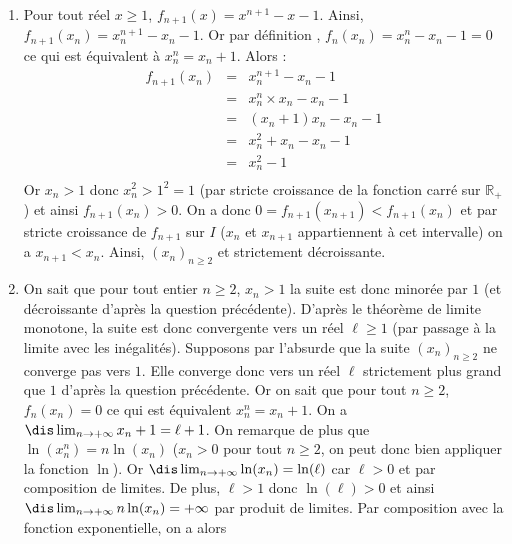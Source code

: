 \documentclass[a4paper,10pt]{report}
\begin{document}
\begin{enumerate}
\begin{center}
\end{center}
La fonction $f_n$ est continue et strictement croissante sur $I$, on a : 
$$\dis \lim_{x \rightarrow 1} f_n(x)=-1, \; \lim_{ x \rightarrow + \infty} f_n(x)= + \infty$$
 et $0 \in ]-1, + \infty [$. D'après le théorème de bijection, il existe un unique réel $x_n \in ]1, + \infty[$ tel que $f_n(x_n)=0.$
\item Pour tout réel $x \geq 1$, $f_{n+1}(x) = x^{n+1}-x-1$. Ainsi, $f_{n+1}(x_n)= x_n^{n+1}-x_n-1$. Or par définition , $f_n(x_n) = x_n^{n}-x_n-1 = 0$ ce qui est équivalent à $x_n^n = x_n+1$. Alors :
\[ \begin{array}{ccl}
f_{n+1}(x_n) & = & x_n^{n+1}-x_n-1 \\
& = & x_n^n \times x_n - x_n - 1 \\
& = & (x_n+1) x_n -x_n -1 \\
& = & x_n^2 +x_n -x_n -1  \\
& = & x_n^2 - 1 \\
\end{array} \]
Or $x_n>1$ donc $x_n^2 > 1^2=1$ (par stricte croissance de la fonction carré sur $\mathbb{R}_+$) et ainsi $f_{n+1}(x_n)>0$.  On a donc $0=f_{n+1}(x_{n+1}) < f_{n+1}(x_n)$ et par stricte croissance de $f_{n+1}$ sur $I$ ($x_n$ et $x_{n+1}$ appartiennent à cet intervalle) on a $x_{n+1} < x_n$. Ainsi, $(x_n)_{n \geq 2}$ et strictement décroissante.
\item On sait que pour tout entier $n \geq 2$, $x_n >1$ la suite est donc minorée par $1$ (et décroissante d'après la question précédente). D'après le théorème de limite monotone, la suite est donc convergente vers un réel $\ell \geq 1$ (par passage à la limite avec les inégalités). 
\noindent Supposons par l'absurde que la suite $(x_n)_{n \geq 2}$ ne converge pas vers $1$. Elle converge donc vers un réel $\ell$ strictement plus grand que $1$ d'après la question précédente. Or on sait que pour tout $n \geq 2$, $f_n(x_n)=0$ ce qui est équivalent $x_n^n = x_n + 1$. On a $\dis \lim_{n \rightarrow + \infty} x_n + 1 = \ell + 1$. On remarque de plus que $\ln(x_n^n) = n \ln(x_n)$ ($x_n>0$ pour tout $n \geq 2$, on peut donc bien appliquer la fonction $\ln$). Or $\dis \lim_{n \rightarrow + \infty} \ln(x_n) = \ln(\ell)$ car $\ell >0$ et par composition de limites. De plus, $\ell>1$ donc $\ln(\ell) >0$ et ainsi $\dis \lim_{n \rightarrow + \infty} n \ln(x_n) = + \infty$ par produit de limites. Par composition avec la fonction exponentielle, on a alors 

\end{enumerate}
\end{document}
